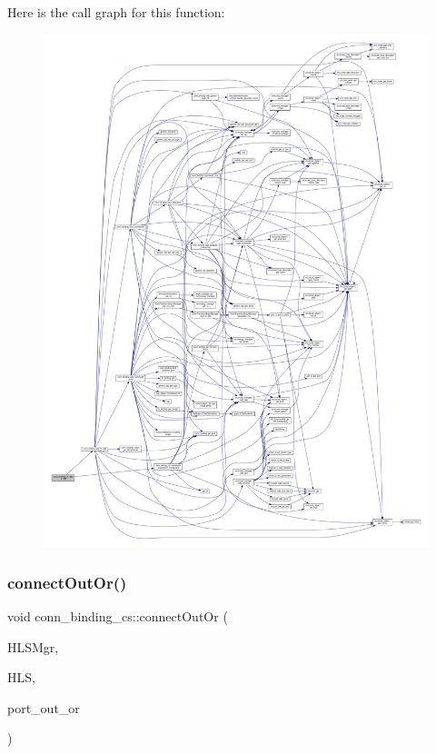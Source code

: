 Here is the call graph for this function\+:
\nopagebreak
\begin{figure}[H]
\begin{center}
\leavevmode
\includegraphics[width=350pt]{db/df4/classconn__binding__cs_a1ab5041953556d30503a795859c3121c_cgraph}
\end{center}
\end{figure}
\mbox{\label{classconn__binding__cs_aedc1d5c3adcfc3f539d6ca0352dd7547}} 
\subsubsection{\texorpdfstring{connect\+Out\+Or()}{connectOutOr()}}
{\footnotesize\ttfamily void conn\+\_\+binding\+\_\+cs\+::connect\+Out\+Or (\begin{DoxyParamCaption}\item[{const \hyperlink{hls__manager_8hpp_acd3842b8589fe52c08fc0b2fcc813bfe}{H\+L\+S\+\_\+manager\+Ref}}]{H\+L\+S\+Mgr,  }\item[{const \hyperlink{hls_8hpp_a75d0c73923d0ddfa28c4843a802c73a7}{hls\+Ref}}]{H\+LS,  }\item[{\hyperlink{structural__objects_8hpp_a8ea5f8cc50ab8f4c31e2751074ff60b2}{structural\+\_\+object\+Ref}}]{port\+\_\+out\+\_\+or }\end{DoxyParamCaption})\hspace{0.3cm}{\ttfamily [protected]}}



